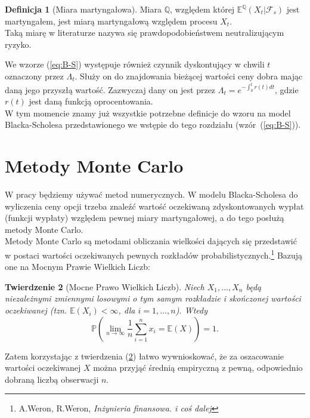 \documentclass[]{pwr_wmat_praca_dyplomowa}
\theoremstyle{plain}
\newtheorem{theorem}{Twierdzenie}
\numberwithin{theorem}{chapter}
\theoremstyle{definition}
\numberwithin{theorem}{chapter}
\newtheorem{definition}[theorem]{Definicja}
\begin{document}
\begin{definition}[Miara martyngałowa]
Miara $\mathbb{Q}$, względem której $\mathbb{E}^{\mathbb{Q}}(X_t|\mathcal{F}_s)$ jest martyngałem, jest miarą martyngałową względem procesu $X_t$.\\
Taką miarę w literaturze nazywa się prawdopodobieństwem neutralizującym ryzyko.
\end{definition}
 
We wzorze (\ref{eq:B-S}) występuje również czynnik dyskontujący w chwili $t$ oznaczony przez $\Lambda_t$. Służy on do znajdowania bieżącej wartości ceny dobra mając daną jego przyszłą wartość. Zazwyczaj dany on jest przez $\Lambda_t = e^{-\int_0^tr(t)dt}$, gdzie $r(t)$ jest daną funkcją oprocentowania.\\

\noindent W tym momencie znamy już wszystkie potrzebne definicje do wzoru na model Blacka-Scholesa przedstawionego we wstępie do tego rozdziału (wzór~(\ref{eq:B-S})).
 
 
\section{Metody Monte Carlo}

W pracy będziemy używać metod numerycznych. W modelu Blacka-Scholesa do wyliczenia ceny opcji trzeba znaleźć wartość oczekiwaną zdyskontowanych wypłat (funkcji wypłaty) względem pewnej miary martyngałowej, a do tego posłużą metody Monte Carlo.\\

Metody Monte Carlo są metodami obliczania wielkości dających się przedstawić w postaci wartości oczekiwanych pewnych rozkładów probabilistycznych.\footnote{A.Weron, R.Weron, \textit{Inżynieria finansowa. i coś dalej}} Bazują one na Mocnym Prawie Wielkich Liczb:

\begin{theorem}[Mocne Prawo Wielkich Liczb]
\label{th:MPWL}
Niech $X_1,\ldots,X_n$ będą niezależnymi zmiennymi losowymi o tym samym rozkładzie i skończonej wartości oczekiwanej (tzn. $\mathbb{E}(X_i)<\infty$, dla $i=1,\ldots,n$). Wtedy
\begin{equation*}
 \mathbb{P}(\lim_{n\rightarrow \infty}\frac{1}{n}\sum_{i=1}^n x_i = \mathbb{E}(X)) = 1.
\end{equation*}
\end{theorem}
\noindent Zatem korzystając z twierdzenia (\ref{th:MPWL}) łatwo wywnioskować, że za oszacowanie wartości oczekiwanej $X$ można przyjąć średnią empiryczną z pewną, odpowiednio dobraną liczbą obserwacji $n$.
\end{document}
